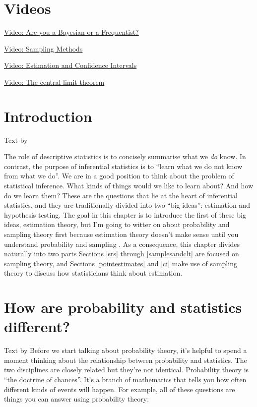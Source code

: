\documentclass[
]{book}
\begin{document}
\hypertarget{videos-2}{%
\section{Videos}\label{videos-2}}

\href{https://www.youtube.com/watch?v=GEFxFVESQXc}{Video: Are you a Bayesian or a Frequentist?}

\href{https://www.youtube.com/watch?v=be9e-Q-jC-0}{Video: Sampling Methods}

\href{https://www.youtube.com/watch?v=_BiVb6neUP0}{Video: Estimation and Confidence Intervals}

\href{https://youtu.be/qpioCUPvyHY}{Video: The central limit theorem}

\hypertarget{estimation}{%
\section{Introduction}\label{estimation}}

Text by \citet{Navarro2018}

The role of descriptive statistics is to concisely summarise what we \emph{do} know. In contrast, the purpose of inferential statistics is to ``learn what we do not know from what we do''. We are in a good position to think about the problem of statistical inference. What kinds of things would we like to learn about? And how do we learn them? These are the questions that lie at the heart of inferential statistics, and they are traditionally divided into two ``big ideas'': estimation and hypothesis testing. The goal in this chapter is to introduce the first of these big ideas, estimation theory, but I'm going to witter on about probability and sampling theory first because estimation theory doesn't make sense until you understand probability and sampling . As a consequence, this chapter divides naturally into two parts Sections \ref{srs} through \ref{samplesandclt} are focused on sampling theory, and Sections \ref{pointestimates} and \ref{ci} make use of sampling theory to discuss how statisticians think about estimation.

\hypertarget{probstats}{%
\section{How are probability and statistics different?}\label{probstats}}

Text by \citet{Navarro2018}
Before we start talking about probability theory, it's helpful to spend a moment thinking about the relationship between probability and statistics. The two disciplines are closely related but they're not identical. Probability theory is ``the doctrine of chances''. It's a branch of mathematics that tells you how often different kinds of events will happen. For example, all of these questions are things you can answer using probability theory:
\end{document}
